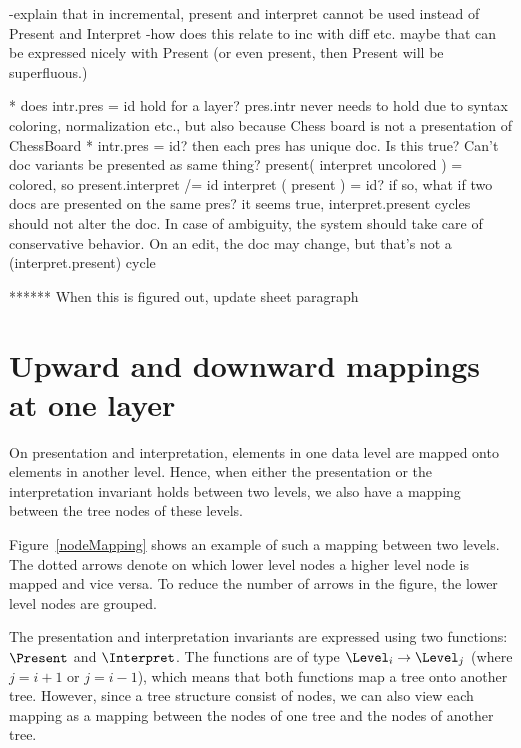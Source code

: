  -explain that in incremental, present and interpret cannot be used instead of Present and Interpret
 -how does this relate to inc with diff etc. maybe that can be expressed nicely with Present
 (or even present, then Present will be superfluous.)

* does   intr.pres = id hold for a layer? pres.intr never needs to hold due to syntax coloring, normalization etc., but also because Chess board is not a presentation of ChessBoard   
* intr.pres = id? then each pres has unique doc. Is this true? Can't doc variants be presented as same thing?
   present( interpret uncolored ) = colored, so present.interpret /= id
   interpret ( present ) = id? if so, what if two docs are presented on the same pres?
 it seems true, interpret.present cycles should not alter the doc. In case of ambiguity, the system should
 take care of conservative behavior. On an edit, the doc may change, but that's not a (interpret.present) cycle

****** When this is figured out, update sheet paragraph
\ec


%																
\section{Upward and downward mappings at one layer}\label{mappingsInLayer}


On presentation and interpretation, elements in one data level are mapped onto elements in another level. Hence, when either the presentation or the interpretation invariant holds between two levels, we also have a mapping between the tree nodes of these levels. 

Figure~\ref{nodeMapping} shows an example of such a mapping between two levels. The dotted arrows denote on which lower level nodes a higher level node is mapped and vice versa. To reduce the number of arrows in the figure, the lower level nodes are grouped.

\bc The presentation and interpretation invariants are expressed using two functions: $\Present$ and $\Interpret$. The functions are of type $\Level_i \rightarrow \Level_j$ (where $j = i+1$ or
$j = i-1$), which means that both functions map a tree onto another tree. However, since a tree structure consist of nodes, we can also view each mapping as a mapping between the nodes of one tree and the nodes of another tree.  
\ec

